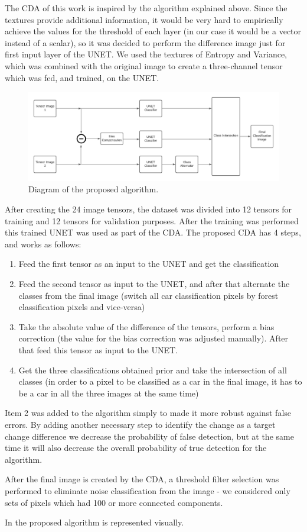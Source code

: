 The CDA of this work is inspired by the algorithm explained above. Since the textures provide additional information, it would be very 
hard to empirically achieve the values for the threshold of each layer (in our case it would be a vector instead of a scalar), so it was decided to perform the difference image
just for first input layer of the UNET.
We used the textures of Entropy and Variance, which was combined with the original image to create a three-channel tensor which was fed, and trained, on the UNET.

\begin{figure}[ht]
    \centering
    \includegraphics[width=\linewidth]{Chapter7/diagrama.png}
    \caption{ Diagram of the proposed algorithm.}
    \label{fig:diagrama}
\end{figure}

After creating the 24 image tensors, the dataset was divided into 12 tensors for training and 12 tensors for validation purposes. 
After the training was performed this trained UNET was used as part of the CDA.
The proposed CDA has 4 steps, and works as follows:
\begin{enumerate}
    \item Feed the first tensor as an input to the UNET and get the classification
    \item Feed the second tensor as input to the UNET, and after that alternate the classes from the final image (switch all car classification pixels by forest classification pixels and vice-versa)
    \item Take the absolute value of the difference of the tensors, perform a bias correction (the value for the bias correction was adjusted manually). After that feed this tensor as input to the UNET.
    \item Get the three classifications obtained prior and take the intersection of all classes (in order to a pixel to be classified as a car in the final image, it has to be a car in all the three images at the same time)
\end{enumerate}

Item 2 was added to the algorithm simply to made it more robust against false errors. By adding another necessary step to identify the change as a target change difference
we decrease the probability of false detection, but at the same time it will also decrease the overall probability of true detection for the algorithm. 

After the final image is created by the CDA, a threshold filter selection was performed to eliminate noise classification from the image - we considered only sets of pixels which had 100 or more connected components.

In  the proposed algorithm is represented visually.

